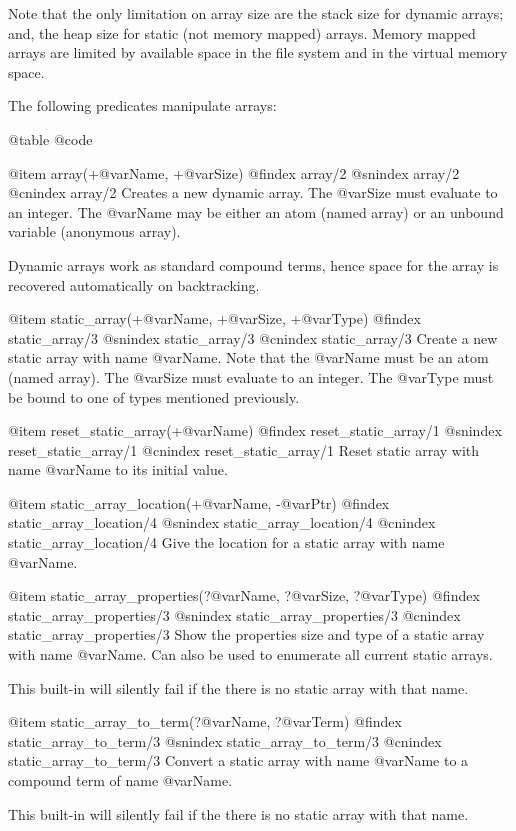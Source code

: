 {{{{{{{Note that the only limitation on array size are the stack size for
dynamic arrays; and, the heap size for static (not memory mapped)
arrays. Memory mapped arrays are limited by available space in the file
system and in the virtual memory space.

The following predicates manipulate arrays:

@table @code

@item array(+@var{Name}, +@var{Size})
@findex array/2
@snindex array/2
@cnindex array/2
Creates a new dynamic array. The @var{Size} must evaluate to an
integer. The @var{Name} may be either an atom (named array) or an
unbound variable (anonymous array).

Dynamic arrays work as standard compound terms, hence space for the
array is recovered automatically on backtracking.

@item static_array(+@var{Name}, +@var{Size}, +@var{Type})
@findex static_array/3
@snindex static_array/3
@cnindex static_array/3
Create a new static array with name @var{Name}. Note that the @var{Name}
must be an atom (named array). The @var{Size} must evaluate to an
integer.  The @var{Type} must be bound to one of types mentioned
previously.

@item reset_static_array(+@var{Name})
@findex reset_static_array/1
@snindex reset_static_array/1
@cnindex reset_static_array/1
Reset static array with name @var{Name} to its initial value.

@item static_array_location(+@var{Name}, -@var{Ptr})
@findex static_array_location/4
@snindex static_array_location/4
@cnindex static_array_location/4
Give the location for  a static array with name
@var{Name}.

@item static_array_properties(?@var{Name}, ?@var{Size}, ?@var{Type})
@findex static_array_properties/3
@snindex static_array_properties/3
@cnindex static_array_properties/3
Show the properties size and type of a static array with name
@var{Name}. Can also be used to enumerate all current
static arrays. 

This built-in will silently fail if the there is no static array with
that name.

@item static_array_to_term(?@var{Name}, ?@var{Term})
@findex static_array_to_term/3
@snindex static_array_to_term/3
@cnindex static_array_to_term/3
Convert a static array with name
@var{Name} to a compound term of name @var{Name}.

This built-in will silently fail if the there is no static array with
that name.

}}}}}}}
